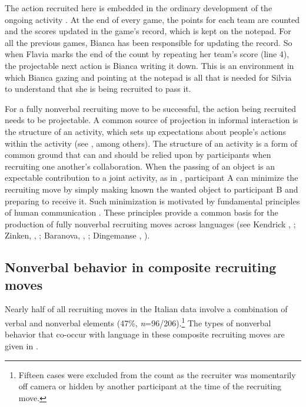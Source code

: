 \documentclass[output=paper,modfonts]{langscibook}
\begin{document}
The action recruited here is embedded in the ordinary development of the ongoing activity \citep{Rossi2014}. At the end of every game, the points for each team are counted and the scores updated in the game's record, which is kept on the notepad. For all the previous games, Bianca has been responsible for updating the record. So when Flavia marks the end of the count by repeating her team's score (line 4), the projectable next action is Bianca writing it down. This is an environment in which Bianca gazing and pointing at the notepad is all that is needed for Silvia to understand that she is being recruited to pass it.

For a fully nonverbal recruiting move to be successful, the action being recruited needs to be projectable. A common source of projection in informal interaction is the structure of an activity, which sets up expectations about people's actions within the activity (see \citealt{Levinson1979,Robinson2013}, among others). The structure of an activity is a form of common ground \citep[93]{Clark1996} that can and should be relied upon by participants when recruiting one another's collaboration. When the passing of an object is an expectable contribution to a joint activity, as in , participant A can minimize the recruiting move by simply making known the wanted object to participant B and preparing to receive it. Such minimization is motivated by fundamental principles of human communication \citep{Grice1975,Levinson2000}. These principles provide a common basis for the production of fully nonverbal recruiting moves across languages (see Kendrick , ; Zinken, , ; Baranova, , ; Dingemanse , ). 

\subsection{Nonverbal behavior in composite recruiting moves}\label{sec:rossi:3.2}

Nearly half of all recruiting moves in the Italian data involve a combination of verbal and nonverbal elements (47\%, \textit{n}=96/206).\footnote{Fifteen cases were excluded from the count as the recruiter was momentarily off camera or hidden by another participant at the time of the recruiting move.} The types of nonverbal behavior that co-occur with language in these composite recruiting moves are given in .
\end{document}
